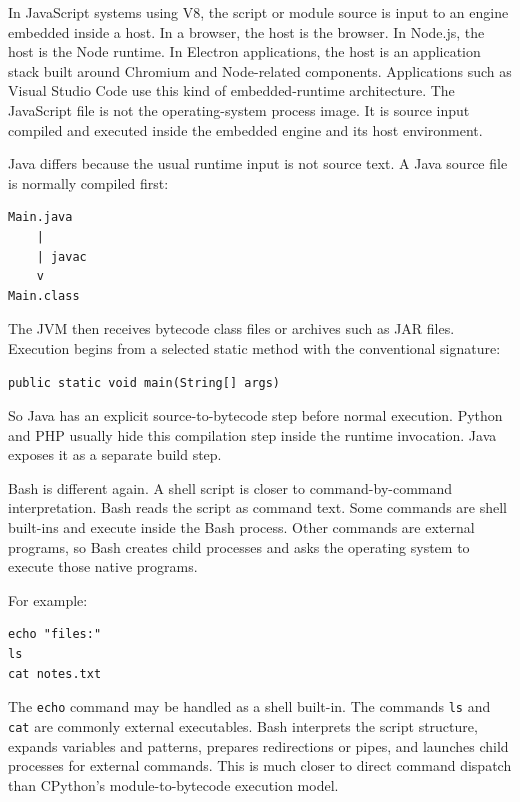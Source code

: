 \documentclass[a4paper,twoside]{report}
\begin{document}
In JavaScript systems using V8, the script or module source is input to an engine embedded inside a host. In a browser, the host is the browser. In Node.js, the host is the Node runtime. In Electron applications, the host is an application stack built around Chromium and Node-related components. Applications such as Visual Studio Code use this kind of embedded-runtime architecture. The JavaScript file is not the operating-system process image. It is source input compiled and executed inside the embedded engine and its host environment.

Java differs because the usual runtime input is not source text. A Java source file is normally compiled first:

\begin{verbatim}
Main.java
    |
    | javac
    v
Main.class
\end{verbatim}

The JVM then receives bytecode class files or archives such as JAR files. Execution begins from a selected static method with the conventional signature:

\begin{verbatim}
public static void main(String[] args)
\end{verbatim}

So Java has an explicit source-to-bytecode step before normal execution. Python and PHP usually hide this compilation step inside the runtime invocation. Java exposes it as a separate build step.

Bash is different again. A shell script is closer to command-by-command interpretation. Bash reads the script as command text. Some commands are shell built-ins and execute inside the Bash process. Other commands are external programs, so Bash creates child processes and asks the operating system to execute those native programs.

For example:

\begin{verbatim}
echo "files:"
ls
cat notes.txt
\end{verbatim}

The \texttt{echo} command may be handled as a shell built-in. The commands \texttt{ls} and \texttt{cat} are commonly external executables. Bash interprets the script structure, expands variables and patterns, prepares redirections or pipes, and launches child processes for external commands. This is much closer to direct command dispatch than CPython's module-to-bytecode execution model.
\end{document}
